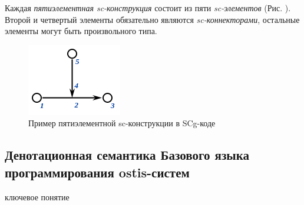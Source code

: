 Каждая \textit{пятиэлементная sc-конструкция} состоит из пяти \textit{sc-элементов} (Рис. \textit{}). Второй и четвертый элементы обязательно являются \textit{sc-коннекторами}, остальные элементы могут быть произвольного типа.

\begin{figure}[H]
	\centering
	\includegraphics[scale=0.8]{images/part3/chapter_situation_management/pic_ps4.png}
	\caption{Пример пятиэлементной sc-конструкции в SCg-коде}
	\label{fig:pic_ps4}
\end{figure}

\subsection{Денотационная семантика Базового языка программирования ostis-систем}
\label{subsec_scp_denot}

\begin{SCn}
\begin{scnrelfromlist}{ключевое понятие}
\end{scnrelfromlist}
\end{SCn}

